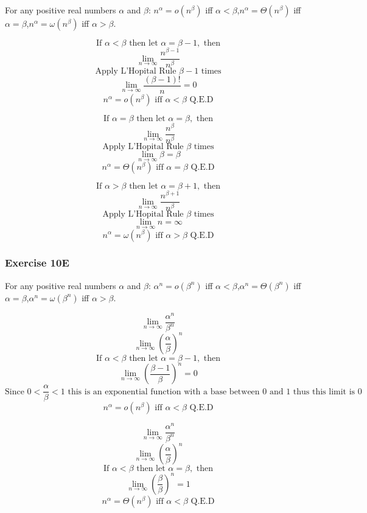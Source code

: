 \documentclass{article}
\begin{document}
For any positive real numbers $\alpha$ and $\beta$: $n^{\alpha} = o(n^{\beta})$ iff $\alpha < \beta$,$n^{\alpha} = \Theta(n^{\beta})$ iff $\alpha = \beta$,$n^{\alpha} = \omega(n^{\beta})$ iff $\alpha > \beta$.

$$\text{If } \alpha < \beta \text{ then let }\alpha = \beta - 1, \text{ then} $$
$$\lim_{n \rightarrow \infty} \frac{n^{\beta - 1}}{n^{\beta}}$$
$$\text{Apply L'Hopital Rule } \beta - 1 \text{ times}$$
$$\lim_{n \rightarrow \infty} \frac{{(\beta - 1)}!}{n} = 0$$
$$n^{\alpha} = o(n^{\beta}) \text{ iff } \alpha < \beta \text{ Q.E.D}$$

$$\text{If } \alpha = \beta \text{ then let }\alpha = \beta, \text{ then} $$
$$\lim_{n \rightarrow \infty} \frac{n^{\beta}}{n^{\beta}}$$
$$\text{Apply L'Hopital Rule } \beta \text{ times}$$
$$\lim_{n \rightarrow \infty} \beta = \beta $$
$$n^{\alpha} = \Theta(n^{\beta}) \text{ iff } \alpha = \beta \text{ Q.E.D}$$

$$\text{If } \alpha > \beta \text{ then let }\alpha = \beta + 1, \text{ then} $$
$$\lim_{n \rightarrow \infty} \frac{n^{\beta + 1}}{n^{\beta}}$$
$$\text{Apply L'Hopital Rule } \beta \text{ times}$$
$$\lim_{n \rightarrow \infty} n = \infty$$
$$n^{\alpha} = \omega(n^{\beta}) \text{ iff } \alpha > \beta \text{ Q.E.D}$$

\subsubsection{Exercise 10E}

For any positive real numbers $\alpha$ and $\beta$: $\alpha^n = o(\beta^n)$ iff $\alpha < \beta$,$\alpha^n = \Theta(\beta^n)$ iff $\alpha = \beta$,$\alpha^n = \omega(\beta^n)$ iff $\alpha > \beta$.

$$\lim_{n \rightarrow \infty} \frac{\alpha^n}{{\beta}^n}$$
$$\lim_{n \rightarrow \infty} (\frac{\alpha}{\beta})^n$$
$$\text{If } \alpha < \beta \text{ then let }\alpha = \beta - 1, \text{ then} $$
$$\lim_{n \rightarrow \infty} (\frac{\beta - 1}{\beta})^n = 0$$
$$\text{Since } 0 < \frac{\alpha}{\beta} < 1 \text{ this is an exponential function with a base between 0 and 1 thus this limit is 0}$$
$$n^{\alpha} = o(n^{\beta}) \text{ iff } \alpha < \beta \text{ Q.E.D}$$

$$\lim_{n \rightarrow \infty} \frac{\alpha^n}{{\beta}^n}$$
$$\lim_{n \rightarrow \infty} (\frac{\alpha}{\beta})^n$$
$$\text{If } \alpha < \beta \text{ then let }\alpha = \beta, \text{ then} $$
$$\lim_{n \rightarrow \infty} (\frac{\beta}{\beta})^n = 1$$
$$n^{\alpha} = \Theta(n^{\beta}) \text{ iff } \alpha < \beta \text{ Q.E.D}$$
\end{document}

